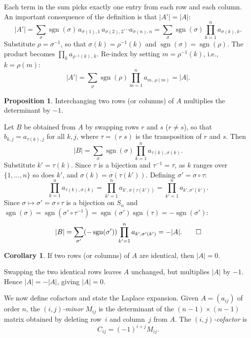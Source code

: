 \documentclass[12pt,a4paper]{article}
\makeatletter
\theoremstyle{definition}
\newtheorem{proposition}{Proposition}
\newtheorem{corollary}{Corollary}
\renewenvironment{proof}[1][\proofname]{\par
  \pushQED{\qed}%
  \normalfont \topsep6\p@\@plus6\p@\relax
  \trivlist
  \item[\hskip\labelsep\bfseries #1\@addpunct{.}]\ignorespaces
}{%
  \popQED\endtrivlist\@endpefalse
}
\makeatother
\begin{document}
Each term in the sum picks exactly one entry from each row and each column. An important consequence of the definition is that $|A'| = |A|$:
\[
|A'| = \sum_{\sigma} \operatorname{sgn}(\sigma)\, a_{\sigma(1),1}\, a_{\sigma(2),2}\cdots a_{\sigma(n),n}
= \sum_{\sigma} \operatorname{sgn}(\sigma) \prod_{k=1}^n a_{\sigma(k),k}.
\]
Substitute $\rho = \sigma^{-1}$, so that $\sigma(k) = \rho^{-1}(k)$ and $\operatorname{sgn}(\sigma) = \operatorname{sgn}(\rho)$. The product becomes $\prod_{k} a_{\rho^{-1}(k),\, k}$. Re-index by setting $m = \rho^{-1}(k)$, i.e., $k = \rho(m)$:
\[
|A'| = \sum_{\rho} \operatorname{sgn}(\rho) \prod_{m=1}^n a_{m,\,\rho(m)} = |A|.
\]

\begin{proposition}\label{prp:row_swap}
Interchanging two rows (or columns) of $A$ multiplies the determinant by $-1$.
\end{proposition}

\begin{proof}
Let $B$ be obtained from $A$ by swapping rows $r$ and $s$ ($r \neq s$), so that $b_{k,j} = a_{\tau(k),j}$ for all $k, j$, where $\tau = (r\; s)$ is the transposition of $r$ and $s$. Then
\[
|B| = \sum_{\sigma} \operatorname{sgn}(\sigma) \prod_{k=1}^n a_{\tau(k),\sigma(k)}.
\]
Substitute $k' = \tau(k)$. Since $\tau$ is a bijection and $\tau^{-1} = \tau$, as $k$ ranges over $\{1, \dots, n\}$ so does $k'$, and $\sigma(k) = \sigma(\tau(k'))$. Defining $\sigma' = \sigma \circ \tau$:
\[
\prod_{k=1}^n a_{\tau(k),\sigma(k)} = \prod_{k'=1}^n a_{k',\sigma(\tau(k'))} = \prod_{k'=1}^n a_{k',\sigma'(k')}.
\]
Since $\sigma \mapsto \sigma' = \sigma \circ \tau$ is a bijection on $S_n$ and $\operatorname{sgn}(\sigma) = \operatorname{sgn}(\sigma' \circ \tau^{-1}) = \operatorname{sgn}(\sigma')\operatorname{sgn}(\tau) = -\operatorname{sgn}(\sigma')$:
\[
|B| = \sum_{\sigma'} (-\operatorname{sgn}(\sigma')) \prod_{k'=1}^n a_{k',\sigma'(k')} = -|A|. \qedhere
\]
\end{proof}

\begin{corollary}\label{cor:identical_rows}
If two rows (or columns) of $A$ are identical, then $|A| = 0$.
\end{corollary}

\begin{proof}
Swapping the two identical rows leaves $A$ unchanged, but multiplies $|A|$ by $-1$. Hence $|A| = -|A|$, giving $|A| = 0$.
\end{proof}

We now define cofactors and state the Laplace expansion. Given $A = (a_{ij})$ of order $n$, the \emph{$(i,j)$-minor} $M_{ij}$ is the determinant of the $(n-1) \times (n-1)$ matrix obtained by deleting row~$i$ and column~$j$ from $A$. The \emph{$(i,j)$-cofactor} is
\[
C_{ij} = (-1)^{i+j} M_{ij}.
\]
\end{document}
